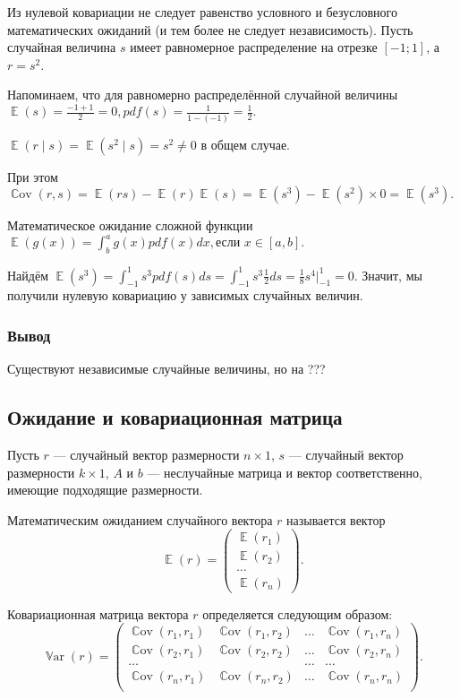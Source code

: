 \documentclass[12pt]{article}
\DeclareMathOperator{\Cov}{\mathbb{C}ov}
\DeclareMathOperator{\Var}{\mathbb{V}ar}
\DeclareMathOperator{\E}{\mathbb{E}}
\newenvironment{sol}{}{}
\begin{document}
\begin{problem}
    Из нулевой ковариации не следует равенство условного и безусловного математических ожиданий (и тем более не следует независимость). Пусть случайная величина $s$ имеет равномерное распределение на отрезке $[-1; 1]$, а $r = s^2$.

    \begin{sol}

    Напоминаем, что для равномерно распределённой случайной величины \(\E(s) = \frac{-1+1}{2} = 0, pdf(s) = \frac{1}{1 - (-1)} = \frac{1}{2}.\)
    
    \(\E(r \mid s) = \E(s^2 \mid s) = s^2 \neq 0\) в общем случае.

    При этом \(\Cov(r, s) = \E(rs) - \E(r)\E(s) = \E(s^3) - \E(s^2) \times 0 = \E(s^3).\)

    Математическое ожидание сложной функции \( \E(g(x)) = \int^a_b g(x) pdf(x) dx, \text{если } x \in [a, b].\)
    
    Найдём \(\E(s^3) = \int^{1}_{-1} s^3 pdf(s) ds = \int^{1}_{-1} s^3 \frac{1}{2} ds = \frac{1}{8} s^4 | ^1_{-1} = 0.\) Значит, мы получили нулевую ковариацию у зависимых случайных величин.    
    \end{sol}
\end{problem}

\subsubsection*{Вывод}
Существуют независимые случайные величины, но на ???

\subsection{Ожидание и ковариационная матрица }

Пусть $r$ — случайный вектор размерности $n \times 1$, $s$ — случайный вектор размерности $k \times 1$, $A$ и $b$ — неслучайные матрица и вектор соответственно, имеющие подходящие размерности.

Математическим ожиданием случайного вектора $r$ называется вектор
\[
\E(r) = \begin{pmatrix}
	\E(r_1)  \\
	\E(r_2)  \\
        \dots \\
        \E(r_n)
      \end{pmatrix}.
\]

Ковариационная матрица вектора $r$ определяется следующим образом:
\[
\Var(r) = \begin{pmatrix}
	\Cov(r_1,r_1) & \Cov(r_1,r_2) & \dots & \Cov(r_1,r_n) \\
	\Cov(r_2,r_1) & \Cov(r_2,r_2) & \dots & \Cov(r_2,r_n) \\
        \dots & & \dots & \dots\\
        \Cov(r_n,r_1) & \Cov(r_n,r_2) & \dots & \Cov(r_n,r_n) \\
      \end{pmatrix}.
\]
\end{document}
